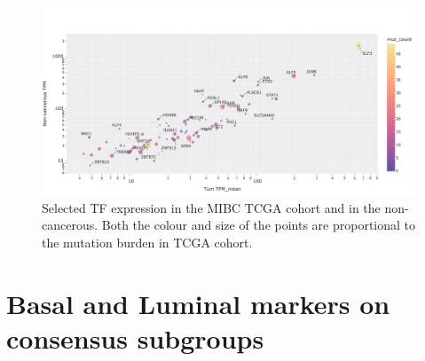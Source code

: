 \begin{figure}[!htb]
    \centering
    \includegraphics[width=1.0\textwidth,keepaspectratio]{Sections/Network_I/Resources/selective_pruning/sel_tfs/sel_tfs_mean_tum_healthy.png}
    \caption[Tumour vs healthy gene expression of the 98 TF]{Selected TF expression in the MIBC TCGA cohort and in the non-cancerous. Both the colour and size of the points are proportional to the mutation burden in TCGA cohort.}
    \label{fig:ap:sel_tfs_mean}
\end{figure}


\section{Basal and Luminal markers on consensus subgroups} \label{s:ap:sel_prun_markers}

